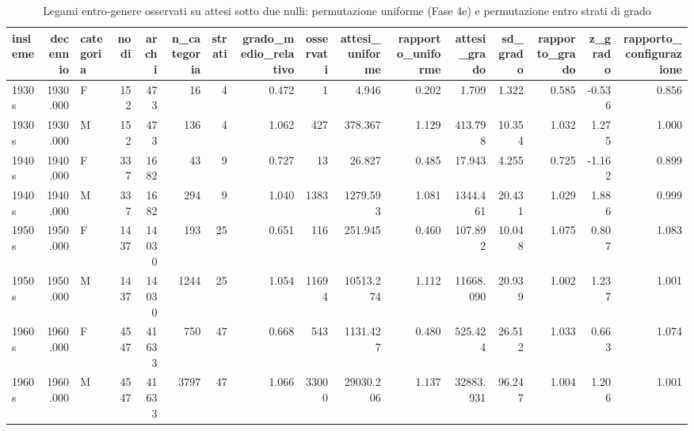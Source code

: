 \begin{table}
\centering
\caption{Legami entro-genere osservati su attesi sotto due nulli: permutazione uniforme (Fase 4e) e permutazione entro strati di grado}
\label{tab:t5_nullo_grado}
\begin{tabular}{lrlrrrrrrrrrrrrr}
\toprule
    insieme &  decennio & categoria &  nodi &  archi &  n\_categoria &  strati &  grado\_medio\_relativo &  osservati &  attesi\_uniforme &  rapporto\_uniforme &  attesi\_grado &  sd\_grado &  rapporto\_grado &  z\_grado &  rapporto\_configurazione \\
\midrule
      1930s &  1930.000 &         F &   152 &    473 &           16 &       4 &                 0.472 &          1 &            4.946 &              0.202 &         1.709 &     1.322 &           0.585 &   -0.536 &                    0.856 \\
      1930s &  1930.000 &         M &   152 &    473 &          136 &       4 &                 1.062 &        427 &          378.367 &              1.129 &       413.798 &    10.354 &           1.032 &    1.275 &                    1.000 \\
      1940s &  1940.000 &         F &   337 &   1682 &           43 &       9 &                 0.727 &         13 &           26.827 &              0.485 &        17.943 &     4.255 &           0.725 &   -1.162 &                    0.899 \\
      1940s &  1940.000 &         M &   337 &   1682 &          294 &       9 &                 1.040 &       1383 &         1279.593 &              1.081 &      1344.461 &    20.431 &           1.029 &    1.886 &                    0.999 \\
      1950s &  1950.000 &         F &  1437 &  14030 &          193 &      25 &                 0.651 &        116 &          251.945 &              0.460 &       107.892 &    10.048 &           1.075 &    0.807 &                    1.083 \\
      1950s &  1950.000 &         M &  1437 &  14030 &         1244 &      25 &                 1.054 &      11694 &        10513.274 &              1.112 &     11668.090 &    20.939 &           1.002 &    1.237 &                    1.001 \\
      1960s &  1960.000 &         F &  4547 &  41633 &          750 &      47 &                 0.668 &        543 &         1131.427 &              0.480 &       525.424 &    26.512 &           1.033 &    0.663 &                    1.074 \\
      1960s &  1960.000 &         M &  4547 &  41633 &         3797 &      47 &                 1.066 &      33000 &        29030.206 &              1.137 &     32883.931 &    96.247 &           1.004 &    1.206 &                    1.001 \\

\end{tabular}
\end{table}
